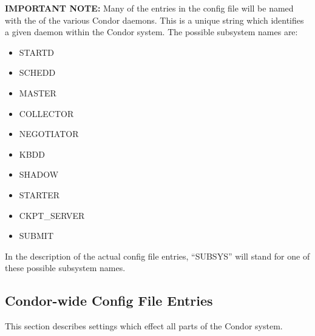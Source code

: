 \textbf{IMPORTANT NOTE:} Many of the entries in the config file will
be named with the  of the various Condor daemons.
This is a unique string which identifies a given daemon within the
Condor system.  The possible subsystem names are:

\begin{itemize}
\item STARTD
\item SCHEDD
\item MASTER
\item COLLECTOR
\item NEGOTIATOR
\item KBDD 
\item SHADOW
\item STARTER
\item CKPT\_SERVER
\item SUBMIT
\label{list:subsystem names}
\end{itemize}

In the description of the actual config file entries, ``SUBSYS'' will
stand for one of these possible subsystem names.

\subsection{Condor-wide Config File Entries}
\label{sec:Condor-wide-Config-File-Entries}
This section describes settings which effect all parts of the Condor
system. 

